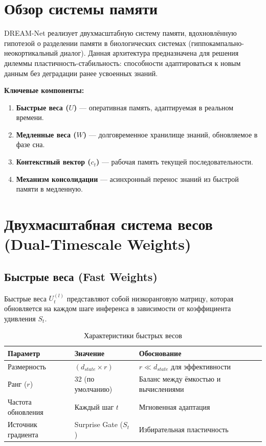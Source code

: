 \section{Обзор системы памяти}

DREAM-Net реализует двухмасштабную систему памяти, вдохновлённую гипотезой о разделении памяти в биологических системах (гиппокампально-неокортикальный диалог). Данная архитектура предназначена для решения дилеммы пластичность-стабильность: способности адаптироваться к новым данным без деградации ранее усвоенных знаний.

\textbf{Ключевые компоненты:}
\begin{enumerate}
    \item \textbf{Быстрые веса ($U$)} — оперативная память, адаптируемая в реальном времени.
    \item \textbf{Медленные веса ($W$)} — долговременное хранилище знаний, обновляемое в фазе сна.
    \item \textbf{Контекстный вектор ($c_t$)} — рабочая память текущей последовательности.
    \item \textbf{Механизм консолидации} — асинхронный перенос знаний из быстрой памяти в медленную.
\end{enumerate}

\section{Двухмасштабная система весов (Dual-Timescale Weights)}

\subsection{Быстрые веса (Fast Weights)}

Быстрые веса $U_t^{(l)}$ представляют собой низкоранговую матрицу, которая обновляется на каждом шаге инференса в зависимости от коэффициента удивления $S_t$.

\begin{table}[h]
\centering
\caption{Характеристики быстрых весов}
\label{tab:fast_weights}
\begin{tabular}{lp{5cm}p{4cm}}
\toprule
\textbf{Параметр} & \textbf{Значение} & \textbf{Обоснование} \\
\midrule
Размерность & $(d_{state} \times r)$ & $r \ll d_{state}$ для эффективности \\
Ранг ($r$) & 32 (по умолчанию) & Баланс между ёмкостью и вычислениями \\
Частота обновления & Каждый шаг $t$ & Мгновенная адаптация \\
Источник градиента & Surprise Gate ($S_t$) & Избирательная пластичность \\
\bottomrule
\end{tabular}
\end{table}

